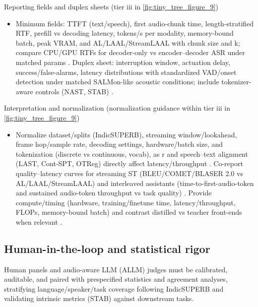 \documentclass{article}
\begin{document}
Reporting fields and duplex sheets (tier iii in \autoref{fig:tiny_tree_figure_9})
\begin{itemize}
  \item Minimum fields: TTFT (text/speech), first audio-chunk time, length-stratified RTF, prefill vs decoding latency, tokens/s per modality, memory-bound batch, peak VRAM, and AL/LAAL/StreamLAAL with chunk size and k; compare CPU/GPU RTFs for decoder-only vs encoder–decoder ASR under matched params \cite{tsunoo2024decoderonlyarchitecturespeechrecognition}. Duplex sheet: interruption window, actuation delay, success/false-alarms, latency distributions with standardized VAD/onset detection under matched SALMon-like acoustic conditions; include tokenizer-aware controls (NAST, STAB) \cite{messica2024nastnoiseawarespeechtokenizationlanguage,maimon2025salmonsuiteacousticlanguagemodelevaluati,vashishth2024stabspeechtokenizerassessmentbenchmark}.
\end{itemize}

Interpretation and normalization (normalization guidance within tier iii in \autoref{fig:tiny_tree_figure_9})
\begin{itemize}
  \item Normalize dataset/splits (IndicSUPERB), streaming window/lookahead, frame hop/sample rate, decoding settings, hardware/batch size, and tokenization (discrete vs continuous, vocab), as r and speech–text alignment (LAST, Cont‑SPT, OTReg) directly affect latency/throughput \cite{turetzky2024lastlanguagemodelawarespeechtokenization,li2025continuousspeechtokenizertext,xu2025optimaltransportregularizationspeechtext}. Co-report quality–latency curves for streaming ST (BLEU/COMET/BLASER 2.0 vs AL/LAAL/StreamLAAL) and interleaved assistants (time-to-first-audio-token and sustained audio-token throughput vs task quality) \cite{maimon2025scalinganalysisinterleavedspeechtextlang,guo2025streamuniachievingstreamingspeechtransla,chen2024bestowefficientstreamablespeechlanguagem,zhao2024textlessstreamingspeechtranslationsemant}. Provide compute/timing (hardware, training/finetune time, latency/throughput, FLOPs, memory-bound batch) and contrast distilled vs teacher front-ends when relevant \cite{maimon2025slammingtrainingspeechlanguagemodelonegp}.
\end{itemize}

\subsection{Human-in-the-loop and statistical rigor} \label{subsec:Human-in-the-loop and statistical rigor}
Human panels and audio-aware LLM (ALLM) judges must be calibrated, auditable, and paired with prespecified statistics and agreement analyses, stratifying language/speaker/task coverage following IndicSUPERB and validating intrinsic metrics (STAB) against downstream tasks.
\end{document}
